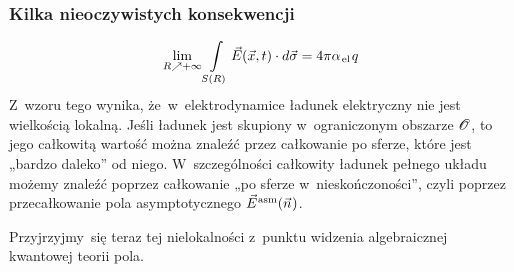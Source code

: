 \documentclass[10pt,t]{beamer}
\begin{document}
\begin{frame}
  \frametitle{Kilka nieoczywistych konsekwencji}




  \begin{equation}
    \label{eq:Glowne-rodzaje-problemow-podczerwonych-11}
    \lim_{ R \nearrow +\infty } \int\limits_{ S( R ) } \vec{E}( \vec{x}, t ) \cdot d\vec{ \sigma } =
    4 \pi \alpha_{ \hspace{0.09em} \text{el} } \hspace{0.09em} q
  \end{equation}
  Z~wzoru tego wynika, że~w~elektrodynamice ładunek
  elektryczny nie jest wielkością lokalną. Jeśli ładunek jest skupiony
  w~ograniczonym obszarze $\mathcal{O}$, to jego \alert{całkowitą} wartość można
  znaleźć przez całkowanie po sferze, które jest „bardzo daleko” od niego.
  W~szczególności całkowity ładunek pełnego układu możemy znaleźć poprzez
  całkowanie „po sferze w~nieskończoności”, czyli poprzez przecałkowanie
  pola asymptotycznego $\vec{E}^{ \hspace{0.05em} \text{asm} }( \vec{n} \hspace{0.05em} )$.

  Przyjrzyjmy~się teraz tej nielokalności z~punktu widzenia algebraicznej
  kwantowej teorii pola.

\end{frame}
\end{document}

